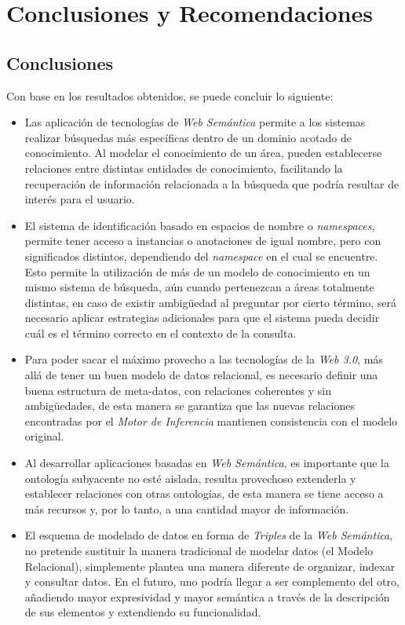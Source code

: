 \chapter{Conclusiones y Recomendaciones}
\label{chap:conclusiones}

\section{Conclusiones}
Con base en los resultados obtenidos, se puede concluir lo siguiente:
\begin{itemize}
    \item Las aplicación de tecnologías de \textit{Web Semántica} permite a los sistemas realizar búsquedas más específicas dentro de un dominio acotado de conocimiento. Al modelar el conocimiento de un área, pueden establecerse relaciones entre distintas entidades de conocimiento, facilitando la recuperación de información relacionada a la búsqueda que podría resultar de interés para el usuario.
    \item El sistema de identificación basado en espacios de nombre o \textit{namespaces}, permite tener acceso a instancias o anotaciones de igual nombre, pero con significados distintos, dependiendo del \textit{namespace} en el cual se encuentre. Esto permite la utilización de más de un modelo de conocimiento en un mismo sistema de búsqueda, aún cuando pertenezcan a áreas totalmente distintas, en caso de existir ambigüedad al preguntar por cierto término, será necesario aplicar estrategias adicionales para que el sistema pueda decidir cuál es el término correcto en el contexto de la consulta.
    \item Para poder sacar el máximo provecho a las tecnologías de la \textit{Web 3.0}, más allá de tener un buen modelo de datos relacional, es necesario definir una buena estructura de meta-datos, con relaciones coherentes y sin ambigüedades, de esta manera se garantiza que las nuevas relaciones encontradas por el \textit{Motor de Inferencia} mantienen consistencia con el modelo original.
    \item Al desarrollar aplicaciones basadas en \textit{Web Semántica}, es importante que la ontología subyacente no esté aislada, resulta provechoso extenderla y establecer relaciones con otras ontologías, de esta manera se tiene acceso a más recursos y, por lo tanto, a una cantidad mayor de información.
    \item El esquema de modelado de datos en forma de \textit{Triples} de la \textit{Web Semántica}, no pretende sustituir la manera tradicional de modelar datos (el Modelo Relacional), simplemente plantea una manera diferente de organizar, indexar y consultar datos. En el futuro, uno podría llegar a ser complemento del otro, añadiendo mayor expresividad y mayor semántica a través de la descripción de sus elementos y extendiendo su funcionalidad.

\end{itemize}
